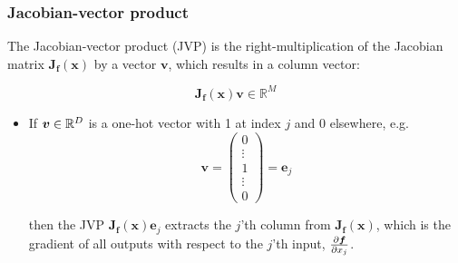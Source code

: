 \documentclass[smaller, handout]{beamer}
\begin{document}
\begin{frame}
  \frametitle{Jacobian-vector product}\pause

  The Jacobian-vector product (JVP) is the right-multiplication of the Jacobian matrix $\bm J_{\bm f}(\bm x)$ by a vector $\bm v$, which results in a column vector:\pause

  \begin{equation}
    \bm J_{\bm f}(\bm x) \bm v \in \mathbb{R}^{M}
  \end{equation}

  \pause
\begin{itemize}
  \item If $\bm v\in \mathbb{R}^{D}$ is a one-hot vector with 1 at index $j$ and 0 elsewhere, e.g.
      \begin{equation}
        \bm v = 
        \begin{pmatrix}
          0 \\ \vdots \\ 1 \\ \vdots \\ 0
        \end{pmatrix} = \bm e_j
      \end{equation}

        then the JVP $\bm J_{\bm f}(\bm x) \bm e_j$ extracts the $j$'th column from $\bm J_{\bm f}(\bm x)$, which is the gradient of all outputs with respect to the $j$'th input, $\frac{\partial{\bm f}}{\partial{x_j}}$.
\end{itemize}
\end{frame}
\end{document}
